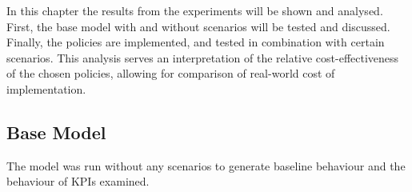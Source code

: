 In this chapter the results from the experiments will be shown and analysed. First, the base model with and without scenarios will be tested and discussed. Finally, the policies are implemented, and tested in combination with certain scenarios. This analysis serves an interpretation of the relative cost-effectiveness of the chosen policies, allowing for comparison of real-world cost of implementation. 



\subsection{Base Model}
\label{s:baserun}

The model was run without any scenarios to generate baseline behaviour and the behaviour of KPIs examined.

